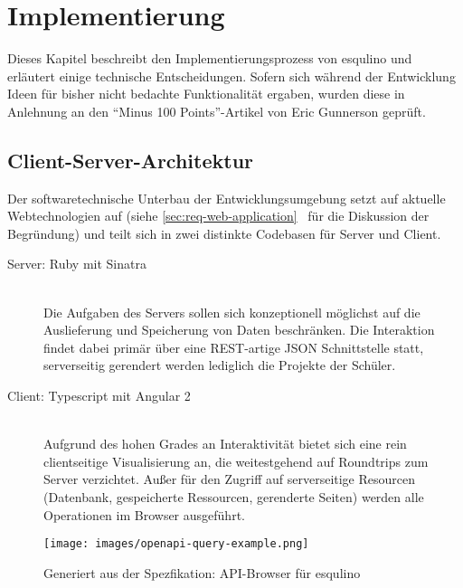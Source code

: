 \section{Implementierung}
\label{sec:implementation-analysis}

Dieses Kapitel beschreibt den Implementierungsprozess von esqulino und erläutert einige technische Entscheidungen. Sofern sich während der Entwicklung Ideen für bisher nicht bedachte Funktionalität ergaben, wurden diese in Anlehnung an den "`Minus 100 Points"'-Artikel von Eric Gunnerson \cite{gunnerson-minus-100} geprüft.


\subsection{Client-Server-Architektur}

Der softwaretechnische Unterbau der Entwicklungsumgebung setzt auf aktuelle Webtechnologien auf (siehe \ref{sec:req-web-application}~ für die Diskussion der Begründung) und teilt sich in zwei distinkte Codebasen für Server und Client.

\begin{description}
\item[Server: Ruby mit Sinatra] \hfill\\
  Die Aufgaben des Servers sollen sich konzeptionell möglichst auf die Auslieferung und Speicherung von Daten beschränken. Die Interaktion findet dabei primär über eine REST-artige JSON Schnittstelle statt, serverseitig gerendert werden lediglich die Projekte der Schüler.
\item[Client: Typescript mit Angular 2] \hfill\\
  Aufgrund des hohen Grades an Interaktivität bietet sich eine rein clientseitige Visualisierung an, die weitestgehend auf Roundtrips zum Server verzichtet. Außer für den Zugriff auf serverseitige Resourcen (Datenbank, gespeicherte Ressourcen, gerenderte Seiten) werden alle Operationen im Browser ausgeführt.
\end{description}

\begin{figure}[p]
  \centering \texttt{[image: images/openapi-query-example.png]}
  \caption{Generiert aus der Spezfikation: API-Browser für esqulino}
  \label{fig:openapi-query-example}
\end{figure}

